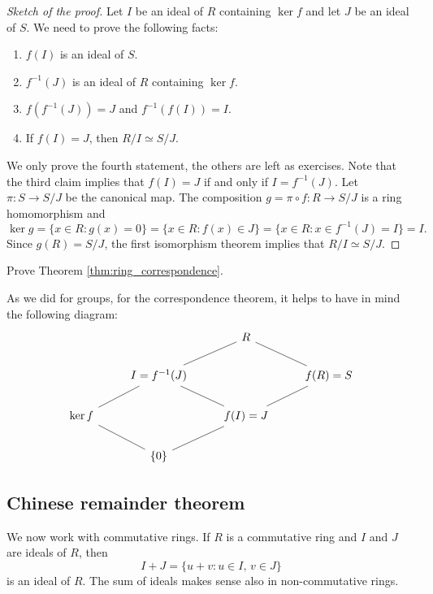 \begin{proof}[Sketch of the proof]
Let $I$ be an ideal of $R$ containing $\ker f$ and
let $J$ be an ideal of $S$. 
We need to prove the following facts:
\begin{enumerate}
\item $f(I)$ is an ideal of $S$.
\item $f^{-1}(J)$ is an ideal of $R$ containing $\ker f$. 
\item $f(f^{-1}(J))=J$ and $f^{-1}(f(I))=I$. 
\item If $f(I)=J$, then $R/I\simeq S/J$. 
\end{enumerate}
We only prove the fourth statement, the others are left as exercises. Note that
the third claim implies that $f(I)=J$ if and only if $I=f^{-1}(J)$. 
Let 
$\pi\colon S\to S/J$ be the canonical map. The composition
$g=\pi\circ f\colon R\to S/J$ is a ring homomorphism and
\[
\ker g=\{x\in R:g(x)=0\}=\{x\in R:f(x)\in J\}=\{x\in R:x\in f^{-1}(J)=I\}=I.
\]
Since $g(R)=S/J$, the first isomorphism theorem implies that $R/I\simeq S/J$.
\end{proof}

\begin{exercise}
    Prove Theorem \ref{thm:ring_correspondence}.
\end{exercise}

As we did for groups, for the correspondence theorem, 
it helps to have in mind the following diagram: 
\[
\begin{tikzcd}
        && R \\
        & I=f^{-1}(J) && f(R)=S \\
        \ker f && f(I)=J \\
        & {\{0\}}
        \arrow[no head, from=1-3, to=2-4]
        \arrow[no head, from=1-3, to=2-2]
        \arrow[no head, from=2-2, to=3-1]
        \arrow[no head, from=3-1, to=4-2]
        \arrow[no head, from=2-2, to=3-3]
        \arrow[no head, from=3-3, to=4-2]
        \arrow[no head, from=2-4, to=3-3]
\end{tikzcd}
\]


\subsection{Chinese remainder theorem}

We now work with commutative rings. 
If $R$ is a commutative ring and $I$ and $J$ are ideals of $R$, then
\[
I+J=\{u+v:u\in I,\,v\in J\}
\]
is an ideal of $R$. The sum of ideals makes sense also in non-commutative rings.  

